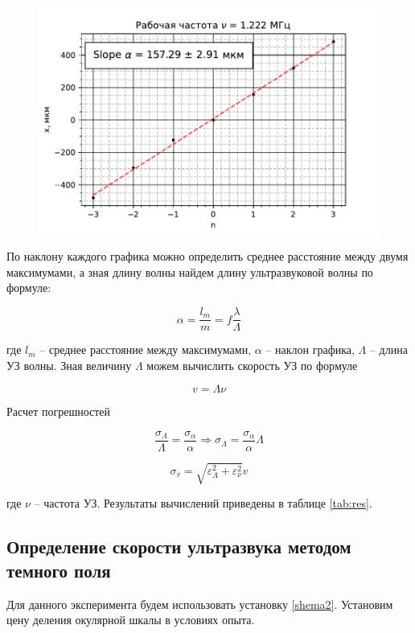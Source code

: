 	\begin{figure}
		\centering
		\includegraphics[scale=1]{./images/frequency4.ods.pdf}
		\label{fig:frequency4}
	\end{figure}

	По наклону каждого графика можно определить среднее расстояние между двумя максимумами, а зная длину волны найдем длину ультразвуковой волны по формуле:
	
	\[ \alpha = \frac{l_m}{m} = f \frac{\lambda}{\Lambda} \]
	
	где $l_m$ -- среднее расстояние между максимумами, $\alpha$ -- наклон графика, $\Lambda$ -- длина УЗ волны. Зная величину $\Lambda$ можем вычислить скорость УЗ по формуле
	
	\[v = \Lambda \nu \]
	
	Расчет погрешностей
	
	\[ \frac{\sigma_{\Lambda}}{\Lambda} = \frac{\sigma_{\alpha}}{\alpha} \Rightarrow \sigma_{\Lambda} = \frac{\sigma_{\alpha}}{\alpha} \Lambda \]
	
	\[ \sigma_{v} = \sqrt{\varepsilon_{\Lambda}^2 + \varepsilon_{\nu}^2} v \]
	
	где $\nu$ -- частота УЗ. Результаты вычислений приведены в таблице \ref{tab:res}.
	
	
	
	\subsection*{Определение скорости ультразвука методом темного поля}
	
	Для данного эксперимента будем использовать установку \ref{shema2}. Установим цену деления окулярной шкалы в условиях опыта.
	
